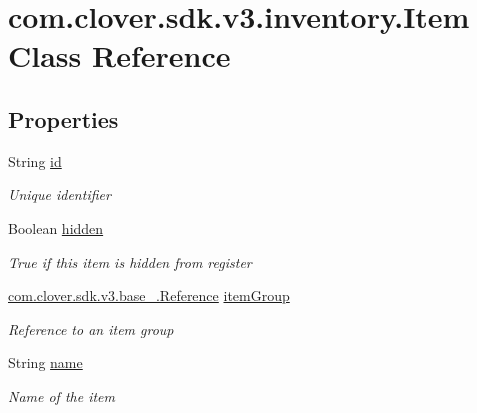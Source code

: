 \hypertarget{classcom_1_1clover_1_1sdk_1_1v3_1_1inventory_1_1_item}{}\section{com.\+clover.\+sdk.\+v3.\+inventory.\+Item Class Reference}
\label{classcom_1_1clover_1_1sdk_1_1v3_1_1inventory_1_1_item}
\subsection*{Properties}
\begin{DoxyCompactItemize}
\item 
String \hyperlink{classcom_1_1clover_1_1sdk_1_1v3_1_1inventory_1_1_item_a96a8ea741bccdec1ff38290072dc81be}{id}
\begin{DoxyCompactList}\small\item\em Unique identifier \end{DoxyCompactList}\item 
Boolean \hyperlink{classcom_1_1clover_1_1sdk_1_1v3_1_1inventory_1_1_item_ab4eb6d5b2ed5d4035d10763126428208}{hidden}
\begin{DoxyCompactList}\small\item\em True if this item is hidden from register \end{DoxyCompactList}\item 
\hyperlink{classcom_1_1clover_1_1sdk_1_1v3_1_1base___1_1_reference}{com.\+clover.\+sdk.\+v3.\+base\+\_\+.\+Reference} \hyperlink{classcom_1_1clover_1_1sdk_1_1v3_1_1inventory_1_1_item_a687ac7bd9f49ab5a607540892f418a22}{item\+Group}
\begin{DoxyCompactList}\small\item\em Reference to an item group \end{DoxyCompactList}\item 
String \hyperlink{classcom_1_1clover_1_1sdk_1_1v3_1_1inventory_1_1_item_a31b1fee3cbaf1135680573c5a7383e7d}{name}
\begin{DoxyCompactList}\small\item\em Name of the item \end{DoxyCompactList}\item 

\end{DoxyCompactItemize}
